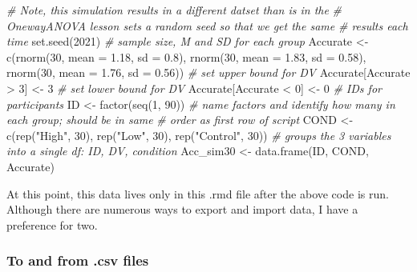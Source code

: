 \documentclass[
  11pt,
]{book}
\newenvironment{Shaded}{\begin{snugshade}}{\end{snugshade}}
\newcommand{\AttributeTok}[1]{\textcolor[rgb]{0.77,0.63,0.00}{#1}}
\newcommand{\CommentTok}[1]{\textcolor[rgb]{0.56,0.35,0.01}{\textit{#1}}}
\newcommand{\DecValTok}[1]{\textcolor[rgb]{0.00,0.00,0.81}{#1}}
\newcommand{\FloatTok}[1]{\textcolor[rgb]{0.00,0.00,0.81}{#1}}
\newcommand{\FunctionTok}[1]{\textcolor[rgb]{0.00,0.00,0.00}{#1}}
\newcommand{\NormalTok}[1]{#1}
\newcommand{\OtherTok}[1]{\textcolor[rgb]{0.56,0.35,0.01}{#1}}
\newcommand{\SpecialCharTok}[1]{\textcolor[rgb]{0.00,0.00,0.00}{#1}}
\newcommand{\StringTok}[1]{\textcolor[rgb]{0.31,0.60,0.02}{#1}}
\begin{document}
\begin{Shaded}
\begin{Highlighting}[]
\CommentTok{\# Note, this simulation results in a different datset than is in the}
\CommentTok{\# OnewayANOVA lesson sets a random seed so that we get the same}
\CommentTok{\# results each time}
\FunctionTok{set.seed}\NormalTok{(}\DecValTok{2021}\NormalTok{)}
\CommentTok{\# sample size, M and SD for each group}
\NormalTok{Accurate }\OtherTok{\textless{}{-}} \FunctionTok{c}\NormalTok{(}\FunctionTok{rnorm}\NormalTok{(}\DecValTok{30}\NormalTok{, }\AttributeTok{mean =} \FloatTok{1.18}\NormalTok{, }\AttributeTok{sd =} \FloatTok{0.8}\NormalTok{), }\FunctionTok{rnorm}\NormalTok{(}\DecValTok{30}\NormalTok{, }\AttributeTok{mean =} \FloatTok{1.83}\NormalTok{,}
    \AttributeTok{sd =} \FloatTok{0.58}\NormalTok{), }\FunctionTok{rnorm}\NormalTok{(}\DecValTok{30}\NormalTok{, }\AttributeTok{mean =} \FloatTok{1.76}\NormalTok{, }\AttributeTok{sd =} \FloatTok{0.56}\NormalTok{))}
\CommentTok{\# set upper bound for DV}
\NormalTok{Accurate[Accurate }\SpecialCharTok{\textgreater{}} \DecValTok{3}\NormalTok{] }\OtherTok{\textless{}{-}} \DecValTok{3}
\CommentTok{\# set lower bound for DV}
\NormalTok{Accurate[Accurate }\SpecialCharTok{\textless{}} \DecValTok{0}\NormalTok{] }\OtherTok{\textless{}{-}} \DecValTok{0}
\CommentTok{\# IDs for participants}
\NormalTok{ID }\OtherTok{\textless{}{-}} \FunctionTok{factor}\NormalTok{(}\FunctionTok{seq}\NormalTok{(}\DecValTok{1}\NormalTok{, }\DecValTok{90}\NormalTok{))}
\CommentTok{\# name factors and identify how many in each group; should be in same}
\CommentTok{\# order as first row of script}
\NormalTok{COND }\OtherTok{\textless{}{-}} \FunctionTok{c}\NormalTok{(}\FunctionTok{rep}\NormalTok{(}\StringTok{"High"}\NormalTok{, }\DecValTok{30}\NormalTok{), }\FunctionTok{rep}\NormalTok{(}\StringTok{"Low"}\NormalTok{, }\DecValTok{30}\NormalTok{), }\FunctionTok{rep}\NormalTok{(}\StringTok{"Control"}\NormalTok{, }\DecValTok{30}\NormalTok{))}
\CommentTok{\# groups the 3 variables into a single df: ID, DV, condition}
\NormalTok{Acc\_sim30 }\OtherTok{\textless{}{-}} \FunctionTok{data.frame}\NormalTok{(ID, COND, Accurate)}
\end{Highlighting}
\end{Shaded}

At this point, this data lives only in this .rmd file after the above code is run. Although there are numerous ways to export and import data, I have a preference for two.

\hypertarget{to-and-from-.csv-files}{%
\subsubsection{To and from .csv files}\label{to-and-from-.csv-files}}
\end{document}

